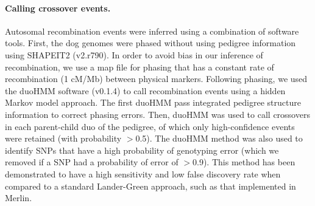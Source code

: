 \paragraph{Calling crossover events.}
Autosomal recombination events were inferred using a combination of software tools.
First, the dog genomes were phased without using pedigree information using SHAPEIT2\cite{Delaneau2013} (v2.r790).
In order to avoid bias in our inference of recombination, we use a map file for phasing that has a constant rate of recombination (1 cM/Mb) between physical markers.
Following phasing, we used the duoHMM\cite{OConnell2014} software (v0.1.4) to call recombination events using a hidden Markov model approach.
The first duoHMM pass integrated pedigree structure information to correct phasing errors.
Then, duoHMM was used to call crossovers in each parent-child duo of the pedigree, of which only high-confidence events were retained (with probability $>$0.5).
The duoHMM method was also used to identify SNPs that have a high probability of genotyping error (which we removed if a SNP had a probability of error of $>$0.9).
This method has been demonstrated to have a high sensitivity and low false discovery rate when compared to a standard Lander-Green\cite{Lander1987} approach, such as that implemented in Merlin\cite{Abecasis2002}.



